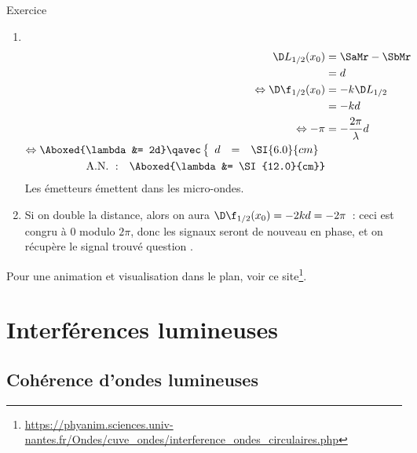 \documentclass[../main/main.tex]{subfiles}
\begin{document}
\begin{rexem}{Exercice}
{\begin{enumerate}[label=\sqenumi]
            retard par rapport à la 2. Ainsi, il y a une valeur de différence de
            marche telle que $\D\f_{1/2}(x_0) = -\pi$, c'est-à-dire que les
            signaux seront en opposition de phase et s'annuleront.
        \item ~
            \vspace{-24pt}
            \begin{align*}
                \D L_{1/2}(x_0) &= \SaMr - \SbMr\\
                                &= d\\
                \Leftrightarrow
                \D\f_{1/2}(x_0) &= -k\D L_{1/2}\\
                                &= -kd\\
                \Leftrightarrow
                -\pi &= - \frac{2\pi}{\lambda}d\\
                \Leftrightarrow
                \Aboxed{\lambda &= 2d}
                \qavec
                \left\{
                    \begin{array}{rcl}
                        d & = & \SI{6.0}{cm}
                    \end{array}
                \right.\\
                \mathrm{A.N.~:}\quad
                \Aboxed{\lambda &= \SI{12.0}{cm}}
            \end{align*}
            Les émetteurs émettent dans les micro-ondes.
        \item Si on double la distance, alors on aura $\D\f_{1/2}(x_0) = -2kd =
            -2\pi$~: ceci est congru à 0 modulo $2\pi$, donc les signaux seront
            de nouveau en phase, et on récupère le signal trouvé question
            .
    \end{enumerate}
    }
\end{rexem}

\vfill
\noindent
Pour une animation et visualisation dans le plan, voir ce
site\footnote{\url{https://phyanim.sciences.univ-nantes.fr/Ondes/cuve_ondes/interference_ondes_circulaires.php}}.

\section{Interférences lumineuses}
\subsection{Cohérence d'ondes lumineuses}
    
\end{document}
